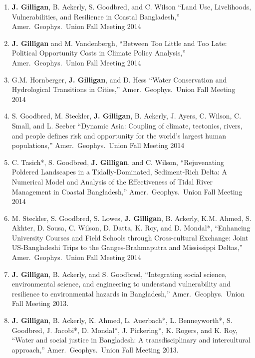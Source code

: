 %
%
\begin{enumerate}

    \item \textbf{J. Gilligan}, B. Ackerly, S. Goodbred, and C. Wilson
    \enquote{Land Use, Livelihoods, Vulnerabilities, and Resilience in Coastal Bangladesh,}
    Amer.\ Geophys.\ Union Fall Meeting 2014

    \item \textbf{J. Gilligan} and M. Vandenbergh,    
    \enquote{Between Too Little and Too Late: Political Opportunity Costs in Climate Policy Analysis,}
    Amer.\ Geophys.\ Union Fall Meeting 2014

    \item G.M. Hornberger, \textbf{J. Gilligan}, and D. Hess
    \enquote{Water Conservation and Hydrological Transitions in Cities,}
    Amer.\ Geophys.\ Union Fall Meeting 2014

    \item S. Goodbred, M. Steckler, \textbf{J. Gilligan}, B. Ackerly, J. Ayers, C. Wilson, C. Small, and L. Seeber
    \enquote{Dynamic Asia: Coupling of climate, tectonics, rivers, and people defines risk and opportunity for the world’s largest human populations,}
    Amer.\ Geophys.\ Union Fall Meeting 2014

    \item C. Tasich*, S. Goodbred, \textbf{J. Gilligan}, and C. Wilson,
    \enquote{Rejuvenating Poldered Landscapes in a Tidally-Dominated, Sediment-Rich Delta: A Numerical Model and Analysis of the Effectiveness of Tidal River Management in Coastal Bangladesh,}
    Amer.\ Geophys.\ Union Fall Meeting 2014
    
    \item M. Steckler, S. Goodbred, S. Lowes, \textbf{J. Gilligan}, B. Ackerly, K.M. Ahmed, S. Akhter, D. Sousa, C. Wilson, D. Datta, K. Roy, and D. Mondal*,
    \enquote{Enhancing University Courses and Field Schools through Cross-cultural Exchange: Joint US-Bangladeshi Trips to the Ganges-Brahmaputra and Mississippi Deltas,}
    Amer.\ Geophys.\ Union Fall Meeting 2014

    \item \textbf{J. Gilligan}, B. Ackerly, and S. Goodbred,
    \enquote{Integrating social science, environmental science, and engineering to understand vulnerability and resilience to environmental hazards in Bangladesh,}
    Amer.\ Geophys.\ Union Fall Meeting 2013.
    
    \item \textbf{J. Gilligan}, B. Ackerly, K. Ahmed, L. Auerbach*, L. Benneyworth*, S. Goodbred, J. Jacobi*,  D. Mondal*, J. Pickering*, K. Rogers, and K. Roy,
    \enquote{Water and social justice in Bangladesh: A transdisciplinary and intercultural approach,}
    Amer.\ Geophys.\ Union Fall Meeting 2013.
    

\end{enumerate}
